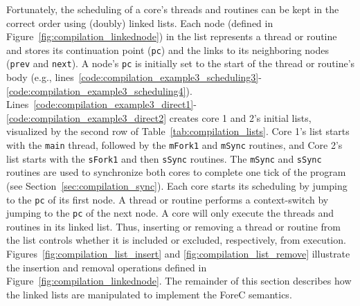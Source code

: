 Fortunately, the scheduling of a core's threads and routines
can be kept in the correct order using (doubly)
linked lists. Each node (defined in Figure~\ref{fig:compilation_linkednode}) 
in the list represents a thread or
routine and stores its continuation point (\verb$pc$) and
the links to its neighboring nodes (\verb$prev$ and
\verb$next$). A node's \verb$pc$ is initially set to the
start of the thread or routine's body (e.g., lines~\ref{code:compilation_example3_scheduling3}-\ref{code:compilation_example3_scheduling4}). 
Lines~\ref{code:compilation_example3_direct1}-\ref{code:compilation_example3_direct2} creates core 1 and 2's initial lists,
visualized by the second row of Table~\ref{tab:compilation_lists}. Core 1's list
starts with the \verb$main$ thread, followed by the
\verb$mFork1$ and \verb$mSync$ routines, and Core 2's list
starts with the \verb$sFork1$ and then \verb$sSync$
routines. The \verb$mSync$ and \verb$sSync$ routines are
used to synchronize both cores to complete one tick of the
program (see Section~\ref{sec:compilation_sync}). Each core
starts its scheduling by jumping to the
\verb$pc$ of its first node. A thread or routine
performs a context-switch by jumping to the \verb$pc$ of the 
next node. A core will only execute the threads
and routines in its linked list. Thus, inserting or removing
a thread or routine from the list controls whether it
is included or excluded, respectively, from execution. 
Figures~\ref{fig:compilation_list_insert} and 
\ref{fig:compilation_list_remove} illustrate the 
insertion and removal operations defined in 
Figure~\ref{fig:compilation_linkednode}. The
remainder of this section describes how the linked lists are
manipulated to implement the ForeC semantics. 


